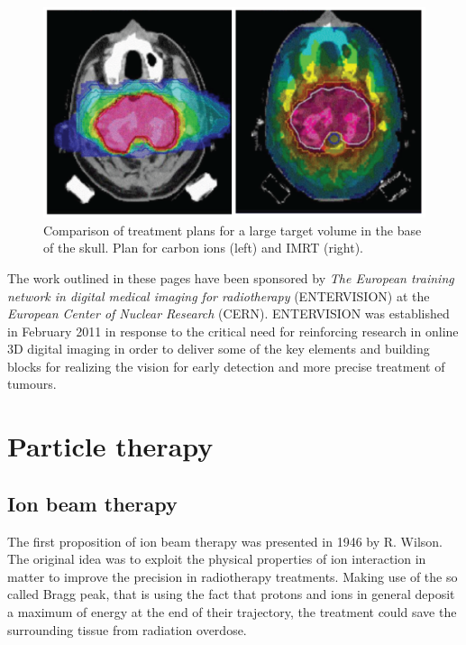 \begin{figure}
\centering
\includegraphics[width=12cm]{Pictures/Chapter_1/treat_conf2.pdf}
\caption[X-ray and proton irradiation]{Comparison of treatment plans for a large target volume in the base of the skull. Plan for carbon ions (left) and IMRT (right)\cite{Durante2010}.}
\label{fig:irradiation}
\end{figure}

The work outlined in these pages have been sponsored by \textit{The European training network in digital medical imaging for radiotherapy} (ENTERVISION) at the \textit{European Center of Nuclear Research} (CERN). ENTERVISION was established in February 2011 in response to the critical need for reinforcing research in online 3D digital imaging in order to deliver some of the key elements and building blocks for realizing the vision for early detection and more precise treatment of tumours.

\section{Particle therapy}
\subsection{Ion beam therapy}

The first proposition of ion beam therapy was presented in 1946 by R. Wilson\cite{Wilson1946}. The original idea was to exploit the physical properties of ion interaction in matter to improve the precision in radiotherapy treatments.  
Making use of the so called Bragg peak, that is using the fact that protons and ions in general deposit a maximum of energy at the end of their trajectory, the treatment could save the surrounding tissue from radiation overdose.

